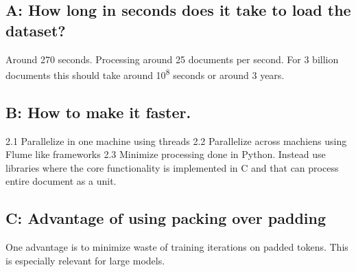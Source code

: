 \documentclass[11pt]{article}
\begin{document}
\subsection{A: How long in seconds does it take to load the dataset?}
\label{sec:org357f1b4}
Around 270 seconds. Processing around 25 documents per second. For 3 billion documents this should take around 10\textsuperscript{8} seconds or around 3 years.
\subsection{B: How to make it faster.}
\label{sec:orga680ee4}
2.1 Parallelize in one machine using threads
2.2 Parallelize across machiens using Flume like frameworks
2.3 Minimize processing done in Python. Instead use libraries where the core functionality is implemented in C and that can process entire document as a unit.
\subsection{C: Advantage of using packing over padding}
\label{sec:orgdad2343}
One advantage is to minimize waste of training iterations on padded tokens. This is especially relevant for large models.
\end{document}
